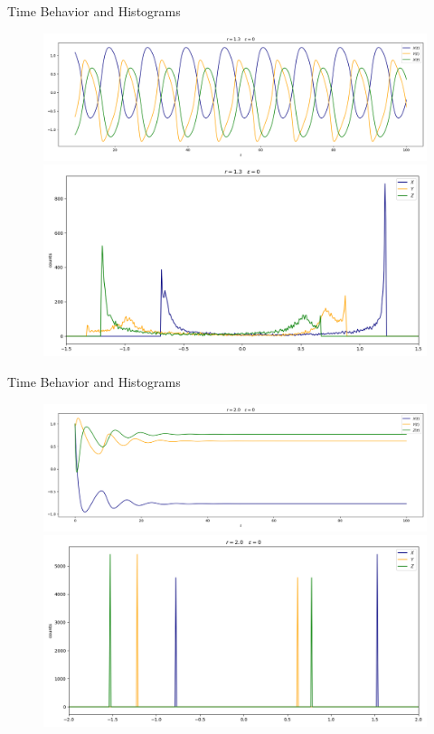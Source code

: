 \documentclass[10pt]{beamer}
\begin{document}
\begin{frame}{Time Behavior and Histograms}
	\begin{figure}
		\includegraphics[width=\textwidth, height=0.52\textheight,keepaspectratio]{./figures_2/r1.3-noiseless-time-trajectories.png}
		\includegraphics[width=\textwidth, height=0.52\textheight,keepaspectratio]{./figures_2/r1.3-noiseless-hist-2.png}
	\end{figure}
\end{frame}

\begin{frame}{Time Behavior and Histograms}
	\begin{figure}
		\includegraphics[width=\textwidth, height=0.52\textheight,keepaspectratio]{./figures_2/r2-noiseless-time-trajectories.png}
		\includegraphics[width=\textwidth, height=0.52\textheight,keepaspectratio]{./figures_2/r2-noiseless-hist.png}
	\end{figure}
\end{frame}
\end{document}
